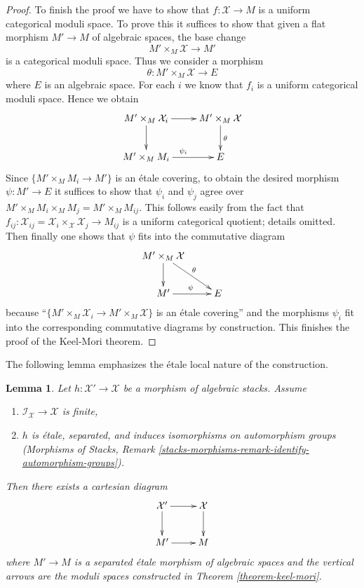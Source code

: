 \documentclass{stacks-project}
\theoremstyle{plain}
\newtheorem{lemma}[subsection]{Lemma}
\theoremstyle{definition}
\theoremstyle{remark}
\numberwithin{equation}{subsection}
\begin{document}
\begin{proof}
\medskip\noindent
To finish the proof we have to show that $f : \mathcal{X} \to M$
is a uniform categorical moduli space.
To prove this it suffices to show that given a flat morphism
$M' \to M$ of algebraic spaces, the base change
$$
M' \times_M \mathcal{X} \longrightarrow M'
$$
is a categorical moduli space. Thus we consider a morphism
$$
\theta : M' \times_M \mathcal{X} \longrightarrow E
$$
where $E$ is an algebraic space. For each $i$ we know that
$f_i$ is a uniform categorical moduli space. Hence we obtain
$$
\xymatrix{
M' \times_M \mathcal{X}_i \ar[d] \ar[r] &
M' \times_M \mathcal{X} \ar[d]^\theta \\
M' \times_M M_i \ar[r]^{\psi_i} &
E
}
$$
Since $\{M' \times_M M_i \to M'\}$ is an \'etale covering,
to obtain the desired morphism $\psi : M' \to E$ it suffices
to show that $\psi_i$ and $\psi_j$ agree over
$M' \times_M M_i \times_M M_j = M' \times_M M_{ij}$.
This follows easily from the fact that
$f_{ij} : \mathcal{X}_{ij} =
\mathcal{X}_i \times_\mathcal{X} \mathcal{X}_j \to M_{ij}$ is a uniform
categorical quotient; details omitted.
Then finally one shows that $\psi$ fits into the commutative diagram
$$
\xymatrix{
M' \times_M \mathcal{X} \ar[d] \ar[rd]^\theta \\
M' \ar[r]^\psi &
E
}
$$
because ``$\{M' \times_M \mathcal{X}_i \to M' \times_M \mathcal{X}\}$
is an \'etale covering'' and the morphisms $\psi_i$ fit into the
corresponding commutative diagrams by construction.
This finishes the proof of the Keel-Mori theorem.
\end{proof}

\noindent
The following lemma emphasizes the \'etale local nature of the construction.

\begin{lemma}
\label{lemma-etale-separated-over-keel-mori}
Let $h : \mathcal{X}' \to \mathcal{X}$ be a morphism of algebraic stacks.
Assume
\begin{enumerate}
\item $\mathcal{I}_\mathcal{X} \to \mathcal{X}$ is finite,
\item $h$ is \'etale, separated, and induces isomorphisms on
automorphism groups (Morphisms of Stacks, Remark
\ref{stacks-morphisms-remark-identify-automorphism-groups}).
\end{enumerate}
Then there exists a cartesian diagram
$$
\xymatrix{
\mathcal{X}' \ar[d] \ar[r] &
\mathcal{X} \ar[d] \\
M' \ar[r] &
M
}
$$
where $M' \to M$ is a separated \'etale morphism of algebraic spaces and
the vertical arrows are the moduli spaces constructed in
Theorem \ref{theorem-keel-mori}.
\end{lemma}
\end{document}
